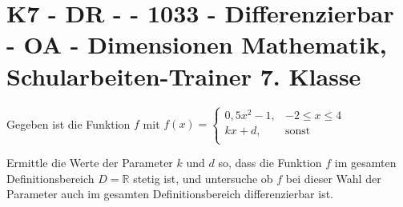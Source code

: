 \section{K7 - DR -  - 1033 - Differenzierbar - OA - Dimensionen Mathematik, Schularbeiten-Trainer 7. Klasse}

\begin{beispiel}[K7 - DR]{1} %
Gegeben ist die Funktion $f$ mit $f(x)=\begin{cases}0,5x^2-1,&-2\leq x\leq 4\\
kx+d,&\text{sonst}\\
\end{cases}$

Ermittle die Werte der Parameter $k$ und $d$ so, dass die Funktion $f$ im gesamten Definitionsbereich $D=\mathbb{R}$ stetig ist, und untersuche ob $f$ bei dieser Wahl der Parameter auch im gesamten Definitionsbereich differenzierbar ist.\leer

				\end{beispiel}